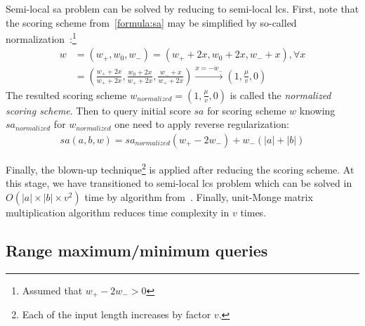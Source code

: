 Semi-local sa problem can be solved by reducing to semi-local lcs.
First, note that the scoring scheme from~\ref{formula:sa} may be simplified by so-called normalization~\cite{.}:\footnote{ Assumed that $w_{+}-2w_{-}>0$}\begin{equation}\label{weightNormalization}
  \begin{array}{ll}
    w &= (w_{+}, w_{0} , w_{-}) = (w_{+} +2x , w_{0} + 2x , w_{-} + x), \forall x\\
    &= ( \frac{w_{+} +2x}{w_{+} +2x} , \frac {w_{0} + 2x}{w_{+} +2x} , \frac{w_{-} + x}{w_{+} +2x})
    \overset{x=-w_{-}}{\to} (1,\frac{\mu}{v} ,0) 
  \end{array}
\end{equation}
The resulted scoring scheme $w_{normalized} = (1,\frac{\mu}{v} ,0)$ is called the \emph{normalized scoring scheme}.
Then to query initial score $sa$ for scoring scheme $w$ knowing $sa_{normalized}$ for $w_{normalized}$ one need to apply reverse regularization:
\begin{equation}
  \begin{aligned}
    sa(a,b,w) = sa_{normalized}  (w_{+} - 2w_{-}) +  w_{-} (|a| + |b|)
  \end{aligned}
\end{equation}

Finally, the blown-up technique\footnote{Each of the input length increases by factor $v$.} is applied after reducing the scoring scheme.
At this stage, we have transitioned to semi-local lcs problem which can be solved in $O(|a| \times |b| \times v^2)$ time by algorithm from~\cite{.}.
Finally, unit-Monge matrix multiplication algorithm reduces time complexity in $v$ times.



\subsection{Range maximum/minimum queries}


